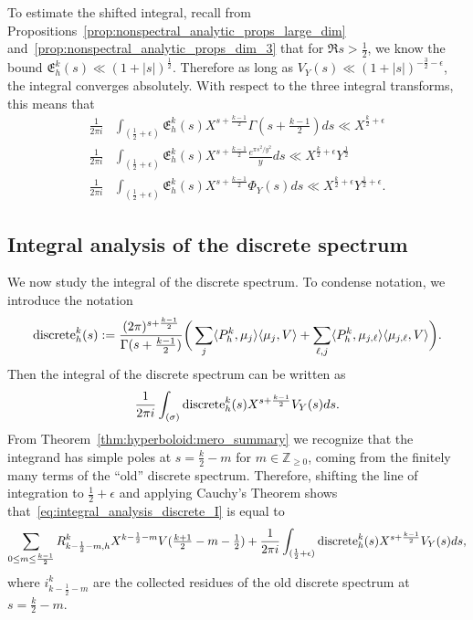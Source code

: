 To estimate the shifted integral, recall from
Propositions~\ref{prop:nonspectral_analytic_props_large_dim}
and~\ref{prop:nonspectral_analytic_props_dim_3} that for $\Re s > \frac{1}{2}$, we know
the bound $\mathfrak{E}_h^k(s) \ll (1 + \lvert s \rvert)^{\frac{1}{2}}$.
Therefore as long as $V_Y(s) \ll (1 + \lvert s \rvert)^{-\frac{3}{2} - \epsilon}$, the
integral converges absolutely.
With respect to the three integral transforms, this means that
\begin{align}
  \frac{1}{2\pi i} &\int_{(\frac{1}{2} + \epsilon)} \mathfrak{E}_h^k(s) X^{s +
  \frac{k-1}{2}} \Gamma(s + \tfrac{k-1}{2}) ds \ll X^{\frac{k}{2} + \epsilon}
  \label{eq:hyperboloid:nonspectral_gamma_integral_bound} \\
  \frac{1}{2\pi i} &\int_{(\frac{1}{2} + \epsilon)} \mathfrak{E}_h^k(s) X^{s +
  \frac{k-1}{2}} \frac{e^{\pi s^2 / y^2}}{y} ds  \ll X^{\frac{k}{2} + \epsilon}
  Y^{\frac{1}{2}} \label{eq:hyperboloid:nonspectral_concentrating_integral_bound}\\
  \frac{1}{2\pi i} &\int_{(\frac{1}{2} + \epsilon)} \mathfrak{E}_h^k(s) X^{s +
  \frac{k-1}{2}} \Phi_Y(s) ds  \ll X^{\frac{k}{2} + \epsilon} Y^{\frac{1}{2}+\epsilon}.
  \label{eq:hyperboloid:nonspectral_compact_integral_bound}
\end{align}



\subsection{Integral analysis of the discrete spectrum}


We now study the integral of the discrete spectrum.
To condense notation, we introduce the notation
\begin{equation}
  \operatorname{discrete}_h^k(s) := \frac{(2\pi)^{s + \frac{k-1}{2}}}{\Gamma(s + \frac{k-1}{2})} \bigg(
  \sum_j \langle P_h^k, \mu_j \rangle \langle \mu_j, V \rangle + \sum_{\ell,j} \langle
P_h^k, \mu_{j,\ell} \rangle \langle \mu_{j, \ell}, V \rangle \bigg).
\end{equation}
Then the integral of the discrete spectrum can be written as
\begin{equation}\label{eq:integral_analysis_discrete_I}
  \frac{1}{2\pi i} \int_{(\sigma)} \operatorname{discrete}_h^k(s) X^{s + \frac{k-1}{2}} V_Y(s) ds.
\end{equation}
From Theorem~\ref{thm:hyperboloid:mero_summary} we recognize that the integrand has simple
poles at $s = \frac{k}{2} - m$ for $m \in \mathbb{Z}_{\geq 0}$, coming from the finitely
many terms of the ``old'' discrete spectrum.
Therefore, shifting the line of integration to $\frac{1}{2} + \epsilon$ and applying
Cauchy's Theorem shows that~\eqref{eq:integral_analysis_discrete_I} is equal to
\begin{equation}
  \sum_{0 \leq m \leq \frac{k-1}{2}} R^k_{k - \frac{1}{2} - m, h} X^{k - \frac{1}{2} - m}
  V(\tfrac{k+1}{2} - m - \tfrac{1}{2}) + \frac{1}{2\pi i} \int_{(\frac{1}{2} + \epsilon)}
  \operatorname{discrete}_h^k(s) X^{s + \frac{k-1}{2}} V_Y(s) ds,
\end{equation}
where $i^k_{k - \frac{1}{2} - m}$ are the collected residues of the old discrete spectrum
at $s = \frac{k}{2} - m$.



